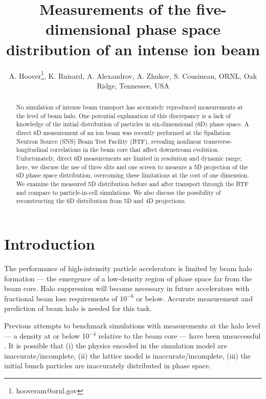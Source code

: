 \documentclass[letterpaper,
               keeplastbox,
               nospread,
               biblatex,
              ]{jacow}
\begin{document}
\title{Measurements of the five-dimensional phase space distribution of an intense ion beam}

\author{A. Hoover\thanks{hooveram@ornl.gov}, K. Ruisard, A. Alexandrov, A. Zhukov, S. Cousineau, ORNL, Oak Ridge, Tennessee, USA}
	
\maketitle

%
\begin{abstract}
No simulation of intense beam transport has accurately reproduced measurements at the level of beam halo. One potential explanation of this discrepancy is a lack of knowledge of the initial distribution of particles in six-dimensional (6D) phase space. A direct 6D measurement of an ion beam was recently performed at the Spallation Neutron Source (SNS) Beam Test Facility (BTF), revealing nonlinear transverse-longitudinal correlations in the beam core that affect downstream evolution. Unfortunately, direct 6D measurements are limited in resolution and dynamic range; here, we discuss the use of three slits and one screen to measure a 5D projection of the 6D phase space distribution, overcoming these limitations at the cost of one dimension. We examine the measured 5D distribution before and after transport through the BTF and compare to particle-in-cell simulations. We also discuss the possibility of reconstructing the 6D distribution from 5D and 4D projections.
\end{abstract}

\section{Introduction}


The performance of high-intensity particle accelerators is limited by beam halo formation — the emergence of a low-density region of phase space far from the beam core. Halo suppression will become necessary in future accelerators with fractional beam loss requirements of $10^{-6}$ or below. Accurate measurement and prediction of beam halo is needed for this task.

Previous attempts to benchmark simulations with measurements at the halo level — a density at or below 10$^{-4}$ relative to the beam core — have been unsuccessful \cite{LEDA, Groening}. It is possible that (i) the physics encoded in the simulation model are inaccurate/incomplete, (ii) the lattice model is inaccurate/incomplete, (iii) the initial bunch particles are inaccurately distributed in phase space. 
\end{document}
